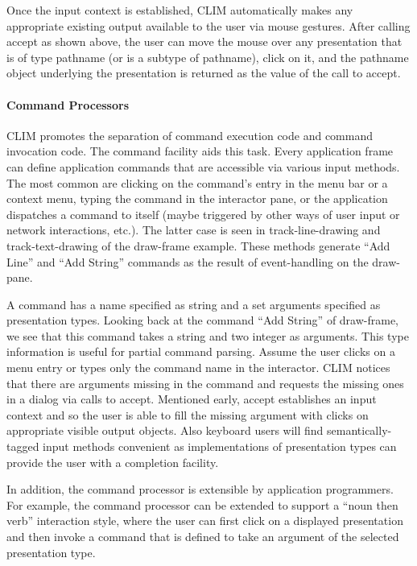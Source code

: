 \documentclass[twocolumn,a4paper]{article}
\newcommand {\code}[1]{{\sffamily #1}}
\newcommand {\CLIM}{{\small CLIM}}
\let\class\code
\let\method\code
\begin{document}
Once the input context is established, \CLIM{} automatically makes any
appropriate existing output available to the user via mouse gestures.
After calling \method{accept} as shown above, the user can move the
mouse over any presentation that is of type pathname (or is a subtype
of pathname), click on it, and the pathname object underlying the
presentation is returned as the value of the call to \code{accept}.

\paragraph*{Command Processors} \CLIM{} promotes the separation of
command execution code and command invocation code. The command
facility aids this task. Every application frame can define
application commands that are accessible via various input methods.
The most common are clicking on the command's entry in the menu bar or
a context menu, typing the command in the interactor pane, or the
application dispatches a command to itself (maybe triggered by other
ways of user input or network interactions, etc.). The latter case is
seen in \code{track-line-drawing} and \code{track-text-drawing} of the
\class{draw-frame} example. These methods generate ``Add Line'' and
``Add String'' commands as the result of event-handling on the
draw-pane.

A command has a name specified as string and a set arguments specified
as presentation types.  Looking back at the command ``Add String'' of
draw-frame, we see that this command takes a string and two integer as
arguments.  This type information is useful for partial command
parsing. Assume the user clicks on a menu entry or types only the
command name in the interactor. \CLIM{} notices that there are
arguments missing in the command and requests the missing ones in a
dialog via calls to \code{accept}. Mentioned early, \code{accept}
establishes an input context and so the user is able to fill the
missing argument with clicks on appropriate visible output objects.
Also keyboard users will find semantically-tagged input methods
convenient as implementations of presentation types can provide the
user with a completion facility.

In addition, the command processor is extensible by application
programmers. For example, the command processor can be extended to
support a ``noun then verb'' interaction style, where the user can
first click on a displayed presentation and then invoke a command that
is defined to take an argument of the selected presentation type.
\end{document}
